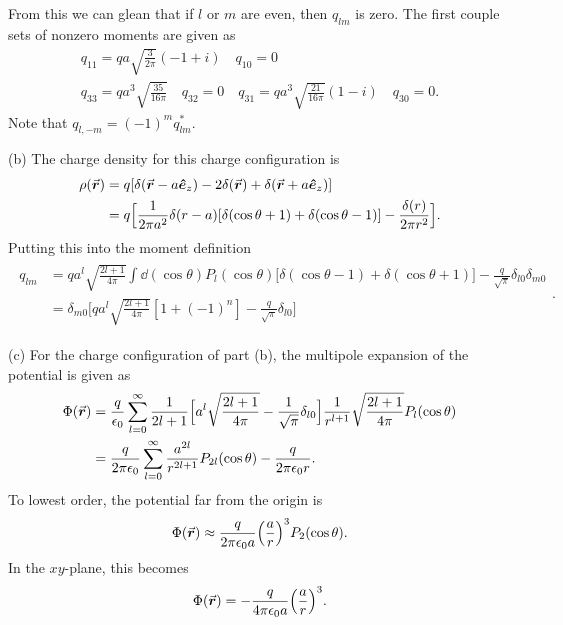 {From this we can glean that if $l$ or $m$ are even, then $q_{lm}$ is zero.
The first couple sets of nonzero moments are given as
\begin{gather}
    q_{11} = qa\sqrt{\frac{3}{2\pi}}(-1+i) \quad q_{10} = 0 \\
    q_{33} = qa^{3} \sqrt{\frac{35}{16 \pi}} \quad q_{32} = 0 \quad q_{31} = qa^3 \sqrt{\frac{21}{16 \pi}}(1-i) \quad q_{30} = 0
.\end{gather}
Note that $q_{l,-m} = (-1)^{m}q_{lm}^{*}$.

(b) The charge density for this charge configuration is
\begin{eqnarray}
\begin{aligned}
    \rho(\va*{r}) &= q[ \delta(\va*{r} - a \vu*{e}_{z}) -2\delta(\va*{r}) + \delta(\va*{r} + a \vu*{e}_{z}) ] \\
                  &= q \Big[ \frac{1}{2 \pi a^2}\delta(r-a) [ \delta(\cos{\theta} + 1) + \delta(\cos{\theta} - 1) ] - \frac{\delta(r)}{2 \pi r^2} \Big]
.\end{aligned}
\end{eqnarray}
Putting this into the moment definition
\begin{eqnarray}
\begin{aligned}
    q_{lm} &= q a^{l} \sqrt{\frac{2l+1}{4\pi}} \int \dd{(\cos{\theta})} P_{l}(\cos{\theta}) \Big[ \delta(\cos{\theta}-1) + \delta(\cos{\theta}+1) \Big] - \frac{q}{\sqrt{\pi}} \delta_{l 0} \delta_{m 0} \\
           &= \delta_{m 0} \Bigg[ q a^{l} \sqrt{\frac{2l+1}{4\pi}} [ 1 + (-1)^{n} ] - \frac{q}{\sqrt{\pi}} \delta_{l 0} \Bigg]
\end{aligned}
.\end{eqnarray}

(c) For the charge configuration of part (b), the multipole expansion of the potential is given as
\begin{eqnarray}
\begin{aligned}
    \Phi(\va*{r}) &= \frac{q}{\epsilon_0} \sum_{l=0}^{\infty} \frac{1}{2l+1} \Big[ a^{l} \sqrt{\frac{2l+1}{4\pi}} - \frac{1}{\sqrt{\pi}} \delta_{l 0} \Big] \frac{1}{r^{l+1}} \sqrt{\frac{2l+1}{4\pi}} P_{l}(\cos{\theta}) \\
                  &= \frac{q}{2 \pi \epsilon_0} \sum_{l=0}^{\infty} \frac{a^{2l}}{r^{2l+1}} P_{2l}(\cos{\theta}) - \frac{q}{2 \pi \epsilon_0 r}
.\end{aligned}
\end{eqnarray}
To lowest order, the potential far from the origin is
\begin{eqnarray}
    \Phi(\va*{r}) \approx \frac{q}{2\pi\epsilon_0 a} \Big( \frac{a}{r} \Big)^3 P_{2}(\cos{\theta})
.\end{eqnarray}
In the $xy$-plane, this becomes
\begin{eqnarray}
    \label{eq:xy-multipole-expansion}
    \Phi(\va*{r}) = -\frac{q}{4\pi\epsilon_0 a} \Big( \frac{a}{r} \Big)^3
.\end{eqnarray}

}
